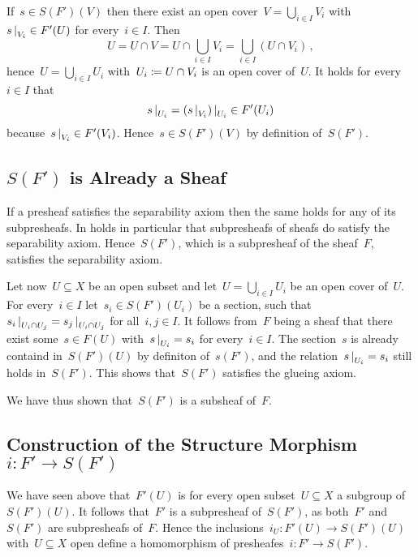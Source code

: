 If~$s \in S(F')(V)$ then there exist an open cover~$V = \bigcup_{i \in I} V_i$ with~$\restrict{s}{V_i} \in F'(U)$ for every~$i \in I$.
Then
\[
    U
  = U \cap V
  = U \cap \bigcup_{i \in I} V_i
  = \bigcup_{i \in I} (U \cap V_i) \,,
\]
hence~$U = \bigcup_{i \in I} U_i$ with~$U_i \coloneqq U \cap V_i$ is an open cover of~$U$.
It holds for every~$i \in I$ that
\[
      \restrict{s}{U_i}
  =   \restrict{(\restrict{s}{V_i})}{U_i}
  \in F'(U_i)
\]
because~$\restrict{s}{V_i} \in F'(V_i)$.
Hence~$s \in S(F')(V)$ by definition of~$S(F')$.





\subsection*{$S(F')$ is Already a Sheaf}

If a presheaf satisfies the separability axiom then the same holds for any of its subpresheafs.
In holds in particular that subpresheafs of sheafs do satisfy the separability axiom.
Hence~$S(F')$, which is a subpresheaf of the sheaf~$F$, satisfies the separability axiom.

Let now~$U \subseteq X$ be an open subset and let~$U = \bigcup_{i \in I} U_i$ be an open cover of~$U$.
For every~$i \in I$ let~$s_i \in S(F')(U_i)$ be a section, such that~$\restrict{s_i}{U_i \cap U_j} = \restrict{s_j}{U_i \cap U_j}$ for all~$i, j \in I$.
It follows from~$F$ being a sheaf that there exist some~$s \in F(U)$ with~$\restrict{s}{U_i} = s_i$ for every~$i \in I$.
The section~$s$ is already containd in~$S(F')(U)$ by definiton of~$s(F')$, and the relation~$\restrict{s}{U_i} = s_i$ still holds in~$S(F')$.
This shows that~$S(F')$ satisfies the glueing axiom.

We have thus shown that~$S(F')$ is a subsheaf of~$F$.





\subsection*{Construction of the Structure Morphism~$i \colon F' \to S(F')$}

We have seen above that~$F'(U)$ is for every open subset~$U \subseteq X$ a subgroup of~$S(F')(U)$.
It follows that~$F'$ is a subpresheaf of~$S(F')$, as both~$F'$ and~$S(F')$ are subpresheafs of~$F$.
Hence the inclusions~$i_U \colon F'(U) \to S(F')(U)$ with~$U \subseteq X$ open define a homomorphism of presheafes~$i \colon F' \to S(F')$.





